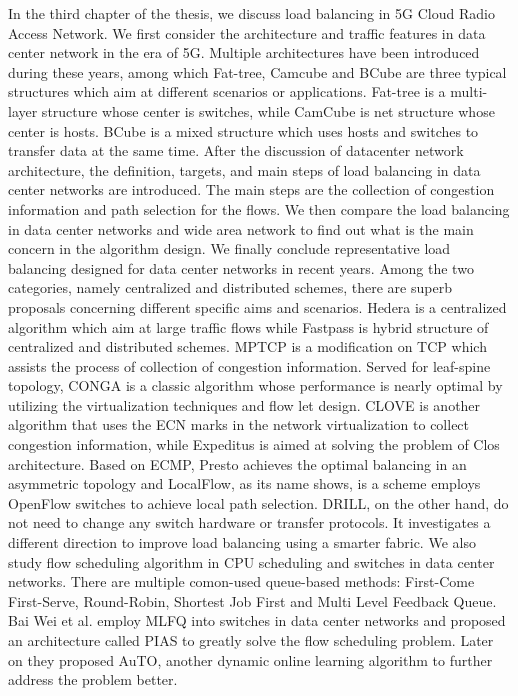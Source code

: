 \begin{bigabstract}
In the third chapter of the thesis, we discuss load balancing in 5G Cloud Radio Access Network. We first consider the architecture and traffic features in data center network in the era of 5G. Multiple architectures have been introduced during these years, among which Fat-tree, Camcube and BCube are three typical structures which aim at different scenarios or applications. Fat-tree is a multi-layer structure whose center is switches, while CamCube is net structure whose center is hosts. BCube is a mixed structure which uses hosts and switches to transfer data at the same time. After the discussion of datacenter network architecture, the definition, targets, and main steps of load balancing in data center networks are introduced. The main steps are the collection of congestion information and path selection for the flows. We then compare the load balancing in data center networks and wide area network to find out what is the main concern in the algorithm design. We finally conclude representative load balancing designed for data center networks in recent years. Among the two categories, namely centralized and distributed schemes, there are superb proposals concerning different specific aims and scenarios. Hedera is a centralized algorithm which aim at large traffic flows while Fastpass is hybrid structure of centralized and distributed schemes. MPTCP is a modification on TCP which assists the process of collection of congestion information. Served for leaf-spine topology, CONGA is a classic algorithm whose performance is nearly optimal by utilizing the virtualization techniques and flow let design. CLOVE is another algorithm that uses the ECN marks in the network virtualization to collect congestion information, while Expeditus is aimed at solving the problem of Clos architecture. Based on ECMP, Presto achieves the optimal balancing in an asymmetric topology and LocalFlow, as its name shows, is a scheme employs OpenFlow switches to achieve local path selection. DRILL, on the other hand, do not need to change any switch hardware or transfer protocols. It investigates a different direction to improve load balancing using a smarter fabric. We also study flow scheduling algorithm in CPU scheduling and switches in data center networks. There are multiple comon-used queue-based methods: First-Come First-Serve, Round-Robin, Shortest Job First and Multi Level Feedback Queue. Bai Wei et al. employ MLFQ into switches in data center networks and proposed an architecture called PIAS to greatly solve the flow scheduling problem. Later on they proposed AuTO, another dynamic online learning algorithm to further address the problem better.


\end{bigabstract}
